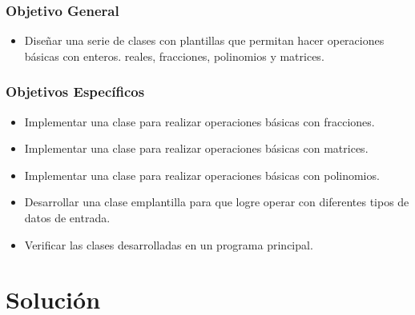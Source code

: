 \subsubsection{Objetivo General}
\begin{itemize}
\item Diseñar una serie de clases con plantillas que permitan hacer operaciones básicas con enteros. reales, fracciones, polinomios y matrices.
\end{itemize}

\subsubsection{Objetivos Específicos}
\begin{itemize}
\item Implementar una clase para realizar operaciones básicas con fracciones.
\item Implementar una clase para realizar operaciones básicas con matrices.
\item Implementar una clase para realizar operaciones básicas con polinomios.
\item Desarrollar una clase emplantilla para que logre operar con diferentes tipos de datos de entrada.
\item Verificar las clases desarrolladas en un programa principal.
\end{itemize}

\newpage

 


\section{Solución}


